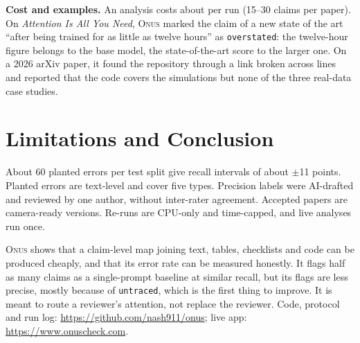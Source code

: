 \documentclass[10pt,twocolumn,twoside,letterpaper]{article}
\newcommand{\onus}{\textsc{Onus}}
\newcommand{\verdict}[1]{\texttt{#1}}
\begin{document}
\textbf{Cost and examples.} An analysis costs about  per run (15--30 claims per paper). On
\emph{Attention Is All You Need}, \onus{} marked the claim of a new state of the art ``after being trained for
as little as twelve hours'' as \verdict{overstated}: the twelve-hour figure belongs to the base model, the
state-of-the-art score to the larger one. On a 2026 arXiv paper, it found the repository through a link broken
across lines and reported that the code covers the simulations but none of the three real-data case studies.

\section{Limitations and Conclusion}
About 60 planted errors per test split give recall intervals of about $\pm$11 points. Planted errors are
text-level and cover five types. Precision labels were AI-drafted and reviewed by one author, without
inter-rater agreement. Accepted papers are camera-ready versions. Re-runs are CPU-only and time-capped, and
live analyses run once.

\onus{} shows that a claim-level map joining text, tables, checklists and code can be produced cheaply, and
that its error rate can be measured honestly. It flags half as many claims as a single-prompt baseline at
similar recall, but its flags are less precise, mostly because of \verdict{untraced}, which is the first
thing to improve. It is meant to route a reviewer's attention, not replace the reviewer. Code, protocol and
run log: \url{https://github.com/nash911/onus}; live app: \url{https://www.onuscheck.com}.

{\small


}
\end{document}

